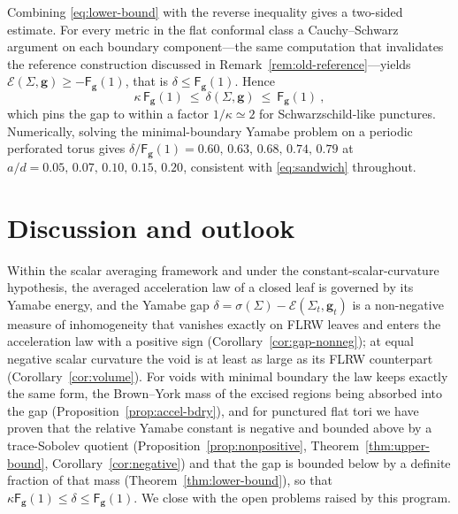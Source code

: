 \documentclass[aps,prd,reprint,amsmath,amssymb,nofootinbib,longbibliography]{revtex4-2}
\newcommand{\g}{\mathbf{g}}                 %
\newcommand{\EH}{\mathcal{E}}               %
\newcommand{\Fq}{\mathsf{F}}                %
\theoremstyle{plain}
\theoremstyle{definition}
\theoremstyle{remark}
\begin{document}
Combining \eqref{eq:lower-bound} with the reverse inequality gives a two-sided estimate. For every metric in the flat conformal class a Cauchy--Schwarz argument on each boundary component---the same computation that invalidates the reference construction discussed in Remark~\ref{rem:old-reference}---yields $\EH(\Sigma,\g)\ge-\Fq_\g(1)$, that is $\delta\le\Fq_\g(1)$. Hence
\begin{equation}
\label{eq:sandwich}
\kappa\,\Fq_\g(1)\ \le\ \delta(\Sigma,\g)\ \le\ \Fq_\g(1)\ ,
\end{equation}
which pins the gap to within a factor $1/\kappa\simeq2$ for Schwarzschild-like punctures. Numerically, solving the minimal-boundary Yamabe problem on a periodic perforated torus gives $\delta/\Fq_\g(1)=0.60,\,0.63,\,0.68,\,0.74,\,0.79$ at $a/d=0.05,\,0.07,\,0.10,\,0.15,\,0.20$, consistent with \eqref{eq:sandwich} throughout.

\section{Discussion and outlook}
\label{sec:discussion}

Within the scalar averaging framework and under the constant-scalar-curvature hypothesis, the averaged acceleration law of a closed leaf is governed by its Yamabe energy, and the Yamabe gap $\delta=\sigma(\Sigma)-\EH(\Sigma_t,\g_t)$ is a non-negative measure of inhomogeneity that vanishes exactly on FLRW leaves and enters the acceleration law with a positive sign (Corollary~\ref{cor:gap-nonneg}); at equal negative scalar curvature the void is at least as large as its FLRW counterpart (Corollary~\ref{cor:volume}). For voids with minimal boundary the law keeps exactly the same form, the Brown--York mass of the excised regions being absorbed into the gap (Proposition~\ref{prop:accel-bdry}), and for punctured flat tori we have proven that the relative Yamabe constant is negative and bounded above by a trace-Sobolev quotient (Proposition~\ref{prop:nonpositive}, Theorem~\ref{thm:upper-bound}, Corollary~\ref{cor:negative}) and that the gap is bounded below by a definite fraction of that mass (Theorem~\ref{thm:lower-bound}), so that $\kappa\Fq_\g(1)\le\delta\le\Fq_\g(1)$. We close with the open problems raised by this program.
\end{document}

